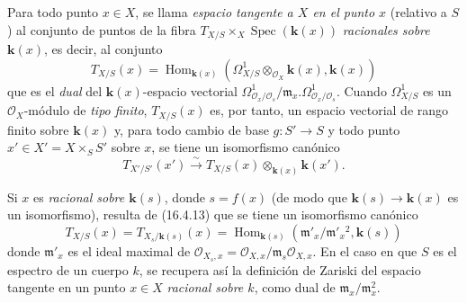 \begin{env}[16.5.13]
\label{IV.16.5.13}
Para todo punto $x\in X$, se llama \emph{espacio tangente a $X$ en el punto $x$}
(relativo a $S$) al conjunto de puntos de la fibra
$T_{X/S}\times_X\operatorname{Spec}(\boldsymbol{k}(x))$ \emph{racionales sobre $\boldsymbol{k}(x)$}, es decir,
al conjunto
\[
  T_{X/S}(x)=
  \operatorname{Hom}_{\mathbf{k}(x)}
  (\varOmega_{X/S}^1\otimes_{\mathcal{O}_X}\boldsymbol{k}(x),\boldsymbol{k}(x))
  \tag{16.5.13.1}
  \label{IV.16.5.13.1}
\]
que es el \emph{dual} del $\boldsymbol{k}(x)$-espacio vectorial
$\Omega_{\mathcal{O}_x/\mathcal{O}_s}^1/
\mathfrak{m}_x.\Omega_{\mathcal{O}_x/\mathcal{O}_s}^1$. Cuando
$\varOmega_{X/S}^1$ es un $\mathcal{O}_X$-módulo de \emph{tipo finito},
$T_{X/S}(x)$ es, por tanto, un espacio vectorial de rango finito sobre $\boldsymbol{k}(x)$ y, para
todo
cambio de base $g:S'\to S$ y todo punto
$x'\in X'=X\times_S S'$ sobre $x$, se tiene un isomorfismo canónico
\[
  T_{X'/S'}(x')\xrightarrow{\sim}
  T_{X/S}(x)\otimes_{\mathbf{k}(x)}\boldsymbol{k}(x').
  \tag{16.5.13.2}
  \label{IV.16.5.13.2}
\]

Si $x$ es \emph{racional sobre $\boldsymbol{k}(s)$}, donde $s=f(x)$ (de modo que
$\boldsymbol{k}(s)\to \boldsymbol{k}(x)$ es un isomorfismo), resulta de (16.4.13) que se tiene un
isomorfismo canónico
\[
  T_{X/S}(x)=T_{X_s/\mathbf{k}(s)}(x)
  =\operatorname{Hom}_{\mathbf{k}(s)}
  (\mathfrak{m}'_x/\mathfrak{m}'_x{}^2,\boldsymbol{k}(s))
  \tag{16.5.13.3}
  \label{IV.16.5.13.3}
\]
donde $\mathfrak{m}'_x$ es el ideal maximal de
$\mathcal{O}_{X_s,x}=\mathcal{O}_{X,x}/
\mathfrak{m}_s\mathcal{O}_{X,x}$. En el caso en que $S$ es el espectro de un cuerpo
$k$, se recupera así la definición de Zariski del espacio tangente en un
punto $x\in X$ \emph{racional sobre $k$}, como dual de
$\mathfrak{m}_x/\mathfrak{m}_x^2$.


\end{env}
